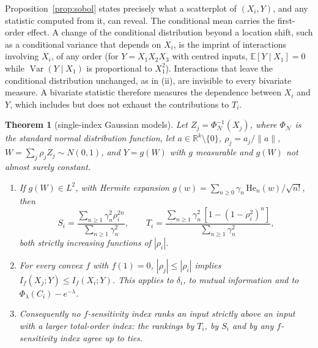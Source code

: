 \documentclass[11pt,a4paper]{article}
\newtheorem{theorem}{Theorem}[section]
\theoremstyle{definition}
\theoremstyle{remark}
\newcommand{\E}{\mathbb{E}}
\newcommand{\Var}{\operatorname{Var}}
\newcommand{\NPhi}{\Phi_{\mathcal N}}
\begin{document}
Proposition~\ref{prop:sobol} states precisely what a scatterplot of $(X_i,Y)$, and any statistic computed from it, can reveal. The conditional mean carries the first-order effect. A change of the conditional distribution beyond a location shift, such as a conditional variance that depends on $X_i$, is the imprint of interactions involving $X_i$, of any order (for $Y=X_1X_2X_3$ with centred inputs, $\E[Y\mid X_1]=0$ while $\Var(Y\mid X_1)$ is proportional to $X_1^2$). Interactions that leave the conditional distribution unchanged, as in (ii), are invisible to every bivariate measure. A bivariate statistic therefore measures the dependence between $X_i$ and $Y$, which includes but does not exhaust the contributions to $T_i$.

\begin{theorem}[single-index Gaussian models]\label{thm:singleindex}
Let $Z_j=\NPhi^{-1}(X_j)$, where $\NPhi$ is the standard normal distribution function, let $a\in\mathbb R^k\setminus\{0\}$, $\rho_j=a_j/\|a\|$, $W=\sum_j\rho_jZ_j\sim N(0,1)$, and $Y=g(W)$ with $g$ measurable and $g(W)$ not almost surely constant.
\begin{enumerate}[label=(\roman*)]
\item If $g(W)\in L^2$, with Hermite expansion $g(w)=\sum_{n\ge0}\gamma_n\,\mathrm{He}_n(w)/\sqrt{n!}$, then
\[
S_i=\frac{\sum_{n\ge1}\gamma_n^2\rho_i^{2n}}{\sum_{n\ge1}\gamma_n^2},\qquad T_i=\frac{\sum_{n\ge1}\gamma_n^2\,[1-(1-\rho_i^2)^n]}{\sum_{n\ge1}\gamma_n^2},
\]
both strictly increasing functions of $|\rho_i|$.
\item For every convex $f$ with $f(1)=0$, $|\rho_j|\le|\rho_i|$ implies $I_f(X_j;Y)\le I_f(X_i;Y)$. This applies to $\delta_i$, to mutual information and to $\Phi_\lambda(C_i)-e^{-\lambda}$.
\item Consequently no $f$-sensitivity index ranks an input strictly above an input with a larger total-order index: the rankings by $T_i$, by $S_i$ and by any $f$-sensitivity index agree up to ties.
\end{enumerate}
\end{theorem}
\end{document}
